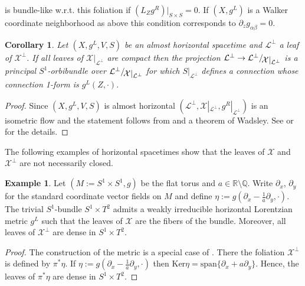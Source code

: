 \documentclass[a4paper,10pt,twoside]{amsart}
\newtheorem{corollary}[theorem]{Corollary}
\theoremstyle{definition}
\newtheorem{example}[theorem]{Example}
\theoremstyle{remark}
\numberwithin{equation}{section}
\begin{document}
is bundle-like w.r.t. this foliation if $(L_{Z}g^{R})|_{S \times S}=0$. If $(X,g^{L})$ is a Walker coordinate neighborhood as above this condition
corresponds to $\partial_{z}g_{\alpha\beta}=0$.
\begin{corollary}\label{horizontal-to-orbibundle}
	Let $(X,g^{L},V,S)$ be an almost horizontal spacetime and $\mathcal{L}^{\perp}$ a leaf of $\mathcal{X}^{\perp}$. If all leaves of
	$\mathcal{X}|_{\mathcal{L}^{\perp}}$ are compact then the projection
	$\mathcal{L}^{\perp} \rightarrow {{{\mathcal{L}^{\perp}}}/\!\raisebox{-.575ex}{\ensuremath{{\mathcal{X}|_{\mathcal{L}^{\perp}}}}}}$ is a principal $S^{1}$-orbibundle over
	${{{\mathcal{L}^{\perp}}}/\!\raisebox{-.575ex}{\ensuremath{{\mathcal{X}|_{\mathcal{L}^{\perp}}}}}}$ for which $S|_{\mathcal{L}^{\perp}}$ defines a connection whose connection
	1-form is $g^{L}(Z,\cdot)$.
\end{corollary}
\begin{proof}
	Since $(X,g^{L},V,S)$ is almost horizontal $(\mathcal{L}^{\perp},\mathcal{X}|_{\mathcal{L}^{\perp}},g^{R}|_{\mathcal{L}^{\perp}})$ is an
	isometric flow and the statement follows from \cite[Prop. 3.7]{MR932463} and a theorem of Wadsley.
	See \cite[Thm. 6.3.8]{MR2382957} or \cite[Prop. 3]{MR2482083} for the details.
\end{proof}
The following examples of horizontal spacetimes show that the leaves of $\mathcal{X}$ and $\mathcal{X}^{\perp}$ are not necessarily closed.
\begin{example}
	Let $(M:=S^{1} \times S^{1},g)$ be the flat torus and $a \in {\mathbb{R}} \setminus {\mathbb{Q}}$. Write $\partial_{x}$, $\partial_{y}$ for the standard coordinate
	vector fields on $M$ and define $\eta:=g(\partial_{x}-\frac{1}{a}\partial_{y},\cdot)$. The trivial $S^{1}$-bundle $S^{1} \times T^{2}$ admits a
	weakly irreducible horizontal Lorentzian metric $g^{L}$ such that the leaves of $\mathcal{X}$ are the fibers of the bundle. Moreover, all leaves
	of $\mathcal{X}^{\perp}$ are dense in $S^{1} \times T^{2}$.
\end{example}
\begin{proof}
	The construction of the metric is a special case of \cite[Prop. 3.1]{laerz-2008-a}. There the foliation $\mathcal{X}^{\perp}$ is defined by
	$\pi^{*}\eta$. If $\eta:=g(\partial_{x}-\frac{1}{a}\partial_{y},\cdot)$ then $\mbox{Ker}\eta = \mbox{span}\{\partial_{x}+a\partial_{y}\}$.
	Hence, the leaves of $\pi^{*}\eta$ are dense in $S^{1} \times T^{2}$.
\end{proof}
\end{document}

